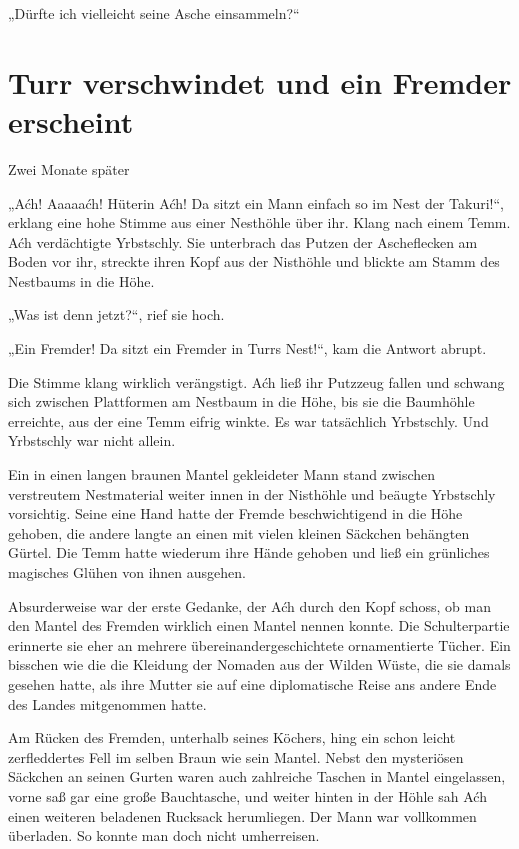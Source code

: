 „Dürfte ich vielleicht seine Asche einsammeln?“


\newpage
\section{Turr verschwindet und ein Fremder erscheint}


Zwei Monate später\bigskip



„Aćh! Aaaaaćh! Hüterin Aćh! Da sitzt ein Mann einfach so im Nest der Takuri!“, erklang eine hohe Stimme aus einer Nesthöhle über ihr. Klang nach einem Temm. Aćh verdächtigte Yrbstschly. Sie unterbrach das Putzen der Ascheflecken am Boden vor ihr, streckte ihren Kopf aus der Nisthöhle und blickte am Stamm des Nestbaums in die Höhe.

„Was ist denn jetzt?“, rief sie hoch.

„Ein Fremder! Da sitzt ein Fremder in Turrs Nest!“, kam die Antwort abrupt.

Die Stimme klang wirklich verängstigt. Aćh ließ ihr Putzzeug fallen und schwang sich zwischen Plattformen am Nestbaum in die Höhe, bis sie die Baumhöhle erreichte, aus der eine Temm eifrig winkte. Es war tatsächlich Yrbstschly. Und Yrbstschly war nicht allein.

Ein in einen langen braunen Mantel gekleideter Mann stand zwischen verstreutem Nestmaterial weiter innen in der Nisthöhle und beäugte Yrbstschly vorsichtig. Seine eine Hand hatte der Fremde beschwichtigend in die Höhe gehoben, die andere langte an einen mit vielen kleinen Säckchen behängten Gürtel. Die Temm hatte wiederum ihre Hände gehoben und ließ ein grünliches magisches Glühen von ihnen ausgehen.

Absurderweise war der erste Gedanke, der Aćh durch den Kopf schoss, ob man den Mantel des Fremden wirklich einen Mantel nennen konnte. Die Schulterpartie erinnerte sie eher an mehrere übereinandergeschichtete ornamentierte Tücher. Ein bisschen wie die die Kleidung der Nomaden aus der Wilden Wüste, die sie damals gesehen hatte, als ihre Mutter sie auf eine diplomatische Reise ans andere Ende des Landes mitgenommen hatte.

Am Rücken des Fremden, unterhalb seines Köchers, hing ein schon leicht zerfleddertes Fell im selben Braun wie sein Mantel. Nebst den mysteriösen Säckchen an seinen Gurten waren auch zahlreiche Taschen in Mantel eingelassen, vorne saß gar eine große Bauchtasche, und weiter hinten in der Höhle sah Aćh einen weiteren beladenen Rucksack herumliegen. Der Mann war vollkommen überladen. So konnte man doch nicht umherreisen.

